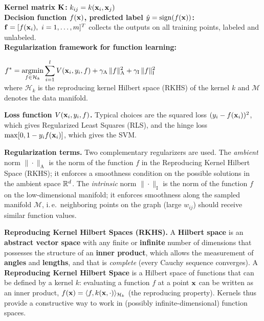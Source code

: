     \textbf{Kernel matrix $\mathbf{K}$:} $k_{ij} = k(\bm{\mathrm{x}}_i, \bm{\mathrm{x}}_j)$\\
    \textbf{Decision function $f(\bm{\mathrm{x}})$, predicted label $\hat y=\operatorname{sign}(f(\bm{\mathrm{x}}))$:} $\bm{\mathrm{f}} = [f(\bm{\mathrm{x}}_i),~i=1,\ldots,m]^T$ collects the outputs on all training points, labeled and unlabeled.\\
    \textbf{Regularization framework for function learning:}\\
  
  \begin{center}
        $\displaystyle
          f^* = \operatorname*{argmin}_{f \in \mathcal{H}_k} 
          \sum_{i=1}^l V(\bm{\mathrm{x}}_i, y_i, f) + 
          \gamma_\text{A} \, \|f\|^2_\text{A} +
          \gamma_\text{I} \, \|f\|^2_\text{I}
        $\\
        {\small where $\mathcal H_k$ is the reproducing kernel Hilbert space (RKHS) of the kernel $k$ and $\mathcal M$ denotes the data manifold.}
  \end{center}
\textbf{Loss function $V(\bm{\mathrm{x}}_i, y_i, f)$.}
  Typical choices are the squared loss \textbf{$(y_i - f(\bm{\mathrm{x}}_i))^2$}, which gives Regularized Least Squares (RLS), and the hinge loss \textbf{$\max [0, 1-y_i f(\bm{\mathrm{x}}_i)]$}, which gives the SVM.
 
\textbf{Regularization terms.}
  Two complementary regularizers are used. The \emph{ambient} norm $\|\cdot\|_\text{A}$ is the norm of the function $f$ in the Reproducing Kernel Hilbert Space (RKHS); it enforces a smoothness condition on the possible solutions in the ambient space $\mathbb{R}^d$. The \emph{intrinsic} norm $\|\cdot\|_\text{I}$ is the norm of the function $f$ on the low-dimensional manifold; it enforces smoothness along the sampled manifold $\mathcal{M}$, i.\,e.\ neighboring points on the graph (large $w_{ij}$) should receive similar function values.

  \textbf{Reproducing Kernel Hilbert Spaces (RKHS).}
  A \textbf{Hilbert space} is an \textbf{abstract vector space} with any finite or \textbf{infinite} number of dimensions that possesses the structure of an \textbf{inner product}, which allows the measurement of \textbf{angles} and \textbf{lengths}, and that is \emph{complete} (every Cauchy sequence converges). A \textbf{Reproducing Kernel Hilbert Space} is a Hilbert space of functions that can be defined by a kernel $k$: evaluating a function $f$ at a point $\bm{\mathrm{x}}$ can be written as an inner product, $f(\bm{\mathrm{x}})=\langle f, k(\bm{\mathrm{x}},\cdot)\rangle_{\mathcal H_k}$ (the reproducing property). Kernels thus provide a constructive way to work in (possibly infinite-dimensional) function spaces.
    
